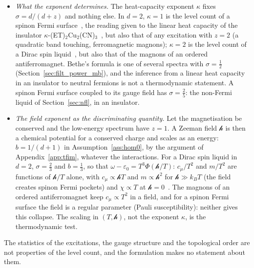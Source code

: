 \documentclass[10pt,a4paper]{article}
\theoremstyle{plain}
\newcommand{\hfield}{\mathscr{h}}  %
\begin{document}
\begin{itemize}
  Majorana fermions of bandwidth $2(J_x+J_y+J_z)$ and static $\mathbb Z_2$
  fluxes, whose excitation energy is a small fraction of that bandwidth:
  the entropy $k_B\ln2$ per spin is released in two maxima of $c_\mu$ of
  $\tfrac12k_B\ln2$ each, at $k_BT_H\simeq0.5\,(J_x+J_y+J_z)$ (fermions)
  and, in the isotropic case, at $k_BT_L\simeq0.01\,(J_x+J_y+J_z)$
  (fluxes)~\cite{Nasu2015}, and the power law $c_\mu\propto T^{2}$ of the
  Majorana fermions, which have a Dirac spectrum ($r=1$ in
  Table~\ref{tab:gases}), holds only below $T_L$.
\item \emph{What the exponent determines.} The heat-capacity exponent
  $\kappa$ fixes $\sigma=d/(d+z)$ and nothing else. In $d=2$, $\kappa=1$
  is the level count of a spinon Fermi surface~\cite{Motrunich2005}, the
  reading given to the linear heat capacity of the insulator
  $\kappa$-(ET)$_2$Cu$_2$(CN)$_3$~\cite{Yamashita2008}, but also that of
  any excitation with $z=2$ (a quadratic band touching, ferromagnetic
  magnons); $\kappa=2$ is the level count of a Dirac spin
  liquid~\cite{Ran2007}, but also that of the magnons of an ordered
  antiferromagnet. Bethe's formula is one of several spectra with
  $\sigma=\tfrac12$ (Section~\ref{sec:filt_power_mb}), and the inference
  from a linear heat capacity in an insulator to neutral fermions is not a
  thermodynamic statement. A spinon Fermi surface coupled to its gauge
  field has $\sigma=\tfrac25$: the non-Fermi liquid of
  Section~\ref{sec:nfl}, in an insulator.
\item \emph{The field exponent as the discriminating quantity.} Let the
  magnetisation be conserved and the low-energy spectrum have $z=1$. A
  Zeeman field $\hfield$ is then a chemical potential for a conserved
  charge and scales as an energy: $b=1/(d+1)$ in
  Assumption~\ref{ass:hom0}, by the argument of
  Appendix~\ref{app:tfim}, whatever the interactions. For a Dirac spin
  liquid in $d=2$, $\sigma=\tfrac23$ and $b=\tfrac13$, so that
  $\omega-\varepsilon_0=T^{3}\Phi(\hfield/T)$: $c_\mu/T^{2}$ and
  $m/T^{2}$ are functions of $\hfield/T$ alone, with $c_\mu\propto\hfield T$
  and $m\propto\hfield^{2}$ for $\hfield\gg k_BT$ (the field creates
  spinon Fermi pockets) and $\chi\propto T$ at $\hfield=0$~\cite{Ran2007}.
  The magnons of an ordered antiferromagnet keep $c_\mu\propto T^{2}$ in a
  field, and for a spinon Fermi surface the field is a regular parameter
  (Pauli susceptibility): neither gives this collapse. The scaling in
  $(T,\hfield)$, not the exponent $\kappa$, is the thermodynamic test.
\end{itemize}
The statistics of the excitations, the gauge structure and the topological
order are not properties of the level count, and the formulation makes no
statement about them.
\end{document}
